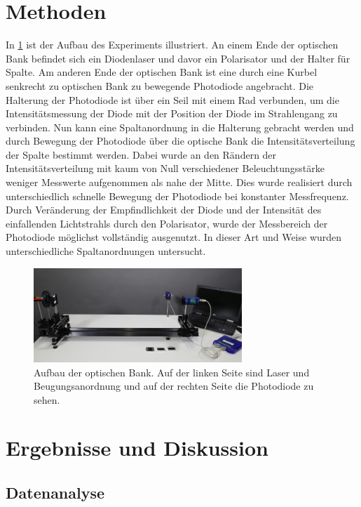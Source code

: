 \documentclass[
	a4paper,
	12pt,
	pagesize,
	ngerman
]{scrartcl}
\begin{document}
	\section{Methoden}
	In \cref{optischeBank} ist der Aufbau des Experiments illustriert.
	An einem Ende der optischen Bank befindet sich ein Diodenlaser und davor ein Polarisator und der Halter für Spalte.
	Am anderen Ende der optischen Bank ist eine durch eine Kurbel senkrecht zu optischen Bank zu bewegende Photodiode angebracht.
	Die Halterung der Photodiode ist über ein Seil mit einem Rad verbunden, um die Intensitätsmessung der Diode mit der Position der Diode im Strahlengang zu verbinden.
	Nun kann eine Spaltanordnung in die Halterung gebracht werden und durch Bewegung der Photodiode über die optische Bank die Intensitätsverteilung der Spalte bestimmt werden.
	Dabei wurde an den Rändern der Intensitätsverteilung mit kaum von Null verschiedener Beleuchtungsstärke weniger Messwerte aufgenommen als nahe der Mitte.
	Dies wurde realisiert durch unterschiedlich schnelle Bewegung der Photodiode bei konstanter Messfrequenz.
	Durch Veränderung der Empfindlichkeit der Diode und der Intensität des einfallenden Lichtstrahls durch den Polarisator, wurde der Messbereich der Photodiode möglichst vollständig ausgenutzt.
	In dieser Art und Weise wurden unterschiedliche Spaltanordnungen untersucht. 
	
	\begin{figure}[H]
		\includegraphics[width=0.7\textwidth]{optischeBank}
		\centering
		\caption{Aufbau der optischen Bank. Auf der linken Seite sind Laser und Beugungsanordnung und auf der rechten Seite die Photodiode zu sehen.\cite{optischeBank} }
		\label{optischeBank}
		\centering
	\end{figure} 
	
	\section{Ergebnisse und Diskussion}
	

	\subsection{Datenanalyse}
	
\end{document}
